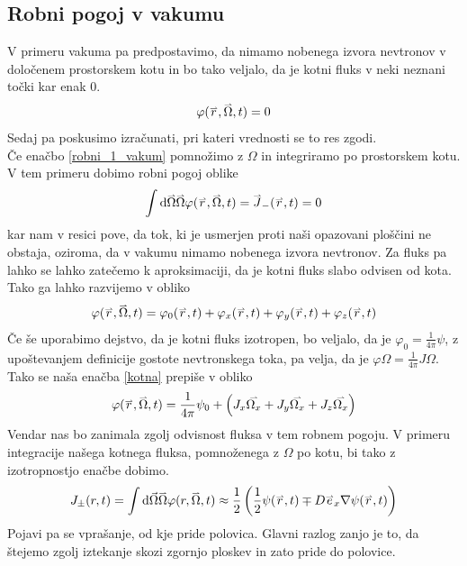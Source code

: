 \documentclass[slovene,11pt,a4paper]{article}
\def\phi{\varphi}
\renewcommand{\vec}[1]{\overset{\smash{\hbox{\raise -0.42ex\hbox{$\scriptscriptstyle\rightharpoonup$}}}}{#1}}
\begin{document}
\subsection{Robni pogoj v vakumu}
V primeru vakuma pa predpostavimo, da nimamo nobenega izvora nevtronov v določenem  prostorskem kotu in bo tako veljalo, da je kotni fluks v neki neznani točki kar enak 0.
\begin{equation}
    \phi(\vec{r},\vec{\Omega}, t)=0
    \label{robni_1_vakum}
\end{equation}
Sedaj pa poskusimo izračunati, pri kateri vrednosti se to res zgodi.\\

Če enačbo  \eqref{robni_1_vakum} pomnožimo z $\Omega$ in integriramo po prostorskem kotu. V tem primeru dobimo robni pogoj oblike
\begin{equation}
    \int \text{d}\vec{\Omega} \vec{\Omega}\phi(\vec{r},\vec{\Omega},t)=\vec{J}_-(\vec{r},t)=0
    \label{robni_2_vakum}
\end{equation}
kar nam v resici pove, da tok, ki je usmerjen proti naši opazovani ploščini ne obstaja, oziroma, da v vakumu nimamo nobenega izvora nevtronov.
Za fluks pa lahko se lahko zatečemo k aproksimaciji, da je kotni fluks slabo odvisen od kota. Tako ga lahko razvijemo v obliko
\begin{equation}
    \phi(\vec{r},\vec{\Omega},t)=\phi_0(\vec{r},t)+\phi_x(\vec{r},t)+\phi_y(\vec{r},t)+\phi_z(\vec{r},t)
    \label{kotna}
\end{equation}
Če še uporabimo dejstvo, da je kotni fluks izotropen, bo veljalo, da je $\phi_0=\frac{1}{4\pi}\psi$, z upoštevanjem definicije gostote nevtronskega toka, pa velja, da je $\phi\Omega=\frac{1}{4\pi}J\Omega$. Tako se naša enačba \eqref{kotna} prepiše v obliko
\begin{equation}
     \phi(\vec{r},\vec{\Omega},t)=\frac{1}{4\pi}\psi_0+\left(J_x\vec{\Omega_x}+J_y\vec{\Omega_x}+J_z\vec{\Omega_x}\right)
\end{equation}
Vendar nas bo zanimala zgolj odvisnost fluksa v tem robnem pogoju. V primeru integracije našega kotnega fluksa, pomnoženega z $\Omega$ po kotu, bi tako z izotropnostjo enačbe dobimo.
\begin{equation}
    J_{\pm}(r,t)=\int\text{d}\Vec{\Omega}\vec{\Omega}\phi(r,\vec{\Omega},t) \approx \frac{1}{2}\left(\frac{1}{2}\psi(\vec{r},t)\mp D \vec{e}_x\nabla\psi(\vec{r},t)\right)
\end{equation}
Pojavi pa se vprašanje, od kje pride polovica. Glavni razlog zanjo je to, da štejemo zgolj iztekanje skozi zgornjo ploskev in zato pride do polovice. 
\end{document}
